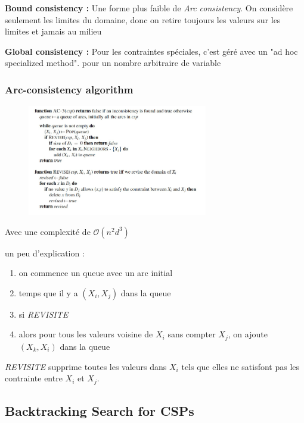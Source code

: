 		\textbf{Bound consistency : }
			Une forme plus faible de \textit{Arc consistency}. On considère seulement les limites du domaine, donc on retire toujours les valeurs sur les limites et jamais au milieu
			
		\textbf{Global consistency : }
			Pour les contraintes spéciales, c'est géré avec un "ad hoc specialized method". pour un nombre arbitraire de variable
			
		\subsubsection{Arc-consistency algorithm}
			\begin{figure}[htp]
				\centering
				\includegraphics[width=0.7\textwidth]{img/AC-3.png}
			\end{figure}
			
			Avec une complexité de $\mathcal{O}(n^2d^3)$
			
			un peu d'explication :
			\begin{enumerate}
				\item on commence un queue avec un arc initial
				\item temps que il y a $(X_i,X_j)$ dans la queue
				\item si \textit{REVISITE}
				\item alors pour tous les valeurs voisine de $X_i$ sans compter $X_j$, on ajoute $(X_k,X_i)$ dans la queue
			\end{enumerate}
			
			\textit{REVISITE} supprime toutes les valeurs dans $X_i$ tels que elles ne satisfont pas les contrainte entre $X_i$ et $X_j$.
			
	\subsection{Backtracking Search for CSPs}
